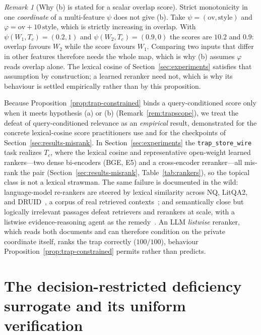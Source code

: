 \documentclass[11pt]{article}
\theoremstyle{plain}
\theoremstyle{definition}
\theoremstyle{remark}
\newtheorem{remark}{Remark}
\begin{document}
\begin{remark}[Why \textup{(b)} is stated for a scalar overlap score]
\label{rem:overlaponly}
Strict monotonicity in one \emph{coordinate} of a multi-feature $\psi$ does not give (b). Take
$\psi=(\mathrm{ov},\mathrm{style})$ and $\varphi=\mathrm{ov}+10\,\mathrm{style}$, which is strictly
increasing in overlap. With $\psi(W_1,T_c)=(0.2,1)$ and $\psi(W_2,T_c)=(0.9,0)$ the scores are
$10.2$ and $0.9$: overlap favours $W_2$ while the score favours $W_1$. Comparing two inputs that
differ in other features therefore needs the whole map, which is why (b) assumes $\varphi$ reads
overlap alone. The lexical cosine of Section~\ref{sec:experiments} satisfies that assumption by
construction; a learned reranker need not, which is why its behaviour is settled empirically
rather than by this proposition.
\end{remark}

Because Proposition~\ref{prop:trap-constrained} binds a query-conditioned score only when it meets
hypothesis \textup{(a)} or \textup{(b)} (Remark~\ref{rem:trapscope}), we treat the defeat of
query-conditioned relevance as an \emph{empirical} result, demonstrated for the concrete
lexical-cosine score practitioners use and for the checkpoints of Section~\ref{sec:results-misrank}. In
Section~\ref{sec:experiments} the \texttt{trap\_store\_wire} task realizes $T_c$, where the lexical
cosine and representative open-weight learned rankers---two dense bi-encoders (BGE, E5) and a
cross-encoder reranker---all mis-rank the pair (Section~\ref{sec:results-misrank},
Table~\ref{tab:rankers}), so the topical class is not a lexical strawman. The same failure is
documented in the wild: language-model re-rankers are steered by lexical similarity across NQ,
LitQA2, and DRUID~\citep{hagstrom2025lexical}, a corpus of real retrieved
contexts~\citep{hagstrom2025druid}; and semantically close but logically irrelevant passages defeat
retrievers and rerankers at scale, with a listwise evidence-reasoning agent as the
remedy~\citep{chen2026deepera}. An LLM \emph{listwise} reranker, which reads both documents and can
therefore condition on the private coordinate itself, ranks the trap correctly ($100/100$), behaviour
Proposition~\ref{prop:trap-constrained} permits rather than predicts.

\section{The decision-restricted deficiency surrogate and its uniform verification}
\label{sec:estimator}
\end{document}
